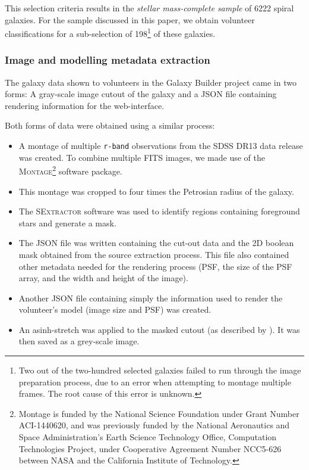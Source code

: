 \documentclass[../main.tex]{subfiles}
\begin{document}
This selection criteria results in the \textit{stellar mass-complete sample} of 6222 spiral galaxies. For the sample discussed in this paper, we obtain volunteer classifications for a sub-selection of 198\footnote{Two out of the two-hundred selected galaxies failed to run through the image preparation process, due to an error when attempting to montage multiple frames. The root cause of this error is unknown.} of these galaxies.

\subsubsection{Image and modelling metadata extraction}

The galaxy data shown to volunteers in the Galaxy Builder project came in two forms: A gray-scale image cutout of the galaxy and a JSON file containing rendering information for the web-interface.

Both forms of data were obtained using a similar process:

\begin{itemize}
\item A montage of multiple \texttt{r-band} observations from the SDSS DR13 data release was created. To combine multiple FITS images, we made use of the \textsc{Montage}\footnote{Montage is funded by the National Science Foundation under Grant Number ACI-1440620, and was previously funded by the National Aeronautics and Space Administration's Earth Science Technology Office, Computation Technologies Project, under Cooperative Agreement Number NCC5-626 between NASA and the California Institute of Technology.}  software package.
\item This montage was cropped to four times the Petrosian radius of the galaxy.
\item The \textsc{SExtractor} software \citep{source-extractor} was used to identify regions containing foreground stars and generate a mask. 
\item The JSON file was written containing the cut-out data and the 2D boolean mask obtained from the source extraction process. This file also contained other metadata needed for the rendering process (PSF, the size of the PSF array, and the width and height of the image).
\item Another JSON file containing simply the information used to render the volunteer's model (image size and PSF) was created.
\item An asinh-stretch was applied to the masked cutout (as described by \citealt{Lupton2003:astro-ph/0312483v1}). It was then saved as a grey-scale image.
\end{itemize}
\end{document}
